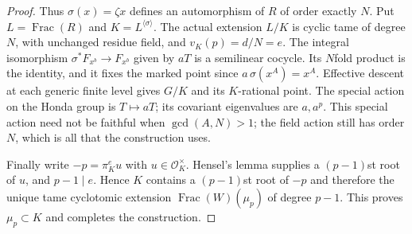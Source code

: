 \begin{proof}
Thus $\sigma(x)=\zeta x$ defines an automorphism of $R$
of order exactly $N$. Put $L=\operatorname{Frac}(R)$
and $K=L^{\langle\sigma\rangle}$. The actual extension
$L/K$ is cyclic tame of degree $N$, with unchanged residue
field, and $v_K(p)=d/N=e$.
The integral isomorphism $\sigma^*F_{x^b}\to F_{x^b}$
given by $aT$ is a semilinear cocycle. Its $N$fold product
is the identity, and it fixes the marked point since
$a\,\sigma(x^A)=x^A$.
Effective descent at each generic finite level gives
$G/K$ and its $K$-rational point.
The special action on the Honda group is $T\mapsto aT$;
its covariant eigenvalues are $a,a^p$.
This special action need not be faithful when $\gcd(A,N)>1$;
the field action still has order $N$, which is all that the
construction uses.

Finally write $-p=\pi_K^e u$ with $u\in\mathcal O_K^\times$.
Hensel's lemma supplies a $(p-1)$st root of $u$, and
$p-1\mid e$. Hence $K$ contains a $(p-1)$st root of $-p$
and therefore the unique tame cyclotomic extension
$\operatorname{Frac}(W)(\mu_p)$ of degree $p-1$.
This proves $\mu_p\subset K$ and completes the construction.
\end{proof}

